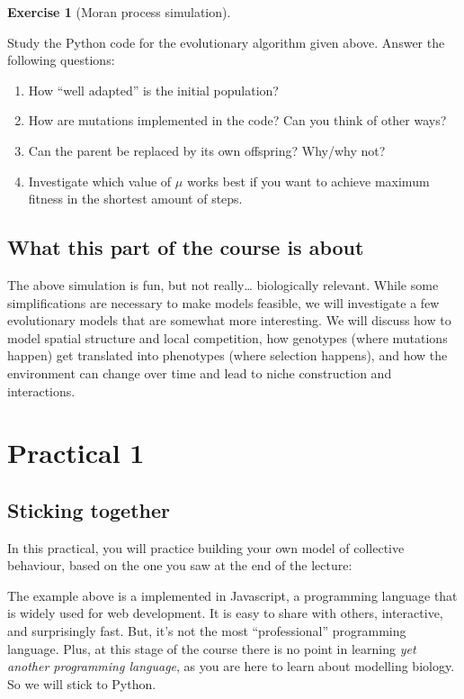 \documentclass[
  letterpaper,
  DIV=11,
  numbers=noendperiod]{scrreprt}
\providecommand{\tightlist}{%
  \setlength{\itemsep}{0pt}\setlength{\parskip}{0pt}}\usepackage{longtable,booktabs,array}
\theoremstyle{definition}
\newtheorem{exercise}{Exercise}[chapter]
\theoremstyle{remark}
\begin{document}
\begin{exercise}[Moran process
simulation]\protect\hypertarget{exr-moran}{}\label{exr-moran}

Study the Python code for the evolutionary algorithm given above. Answer
the following questions:

\begin{enumerate}
\def\labelenumi{\alph{enumi}.}
\tightlist
\item
  How ``well adapted'' is the initial population?
\item
  How are mutations implemented in the code? Can you think of other
  ways?
\item
  Can the parent be replaced by its own offspring? Why/why not?
\item
  Investigate which value of \(\mu\) works best if you want to achieve
  maximum fitness in the shortest amount of steps.
\end{enumerate}

\end{exercise}

\section{What this part of the course is
about}\label{what-this-part-of-the-course-is-about}

The above simulation is fun, but not really\ldots{} biologically
relevant. While some simplifications are necessary to make models
feasible, we will investigate a few evolutionary models that are
somewhat more interesting. We will discuss how to model spatial
structure and local competition, how genotypes (where mutations happen)
get translated into phenotypes (where selection happens), and how the
environment can change over time and lead to niche construction and
interactions.

\chapter{Practical 1}\label{practical-1-3}

\section{Sticking together}\label{sticking-together}

In this practical, you will practice building your own model of
collective behaviour, based on the one you saw at the end of the
lecture:

The example above is a implemented in Javascript, a programming language
that is widely used for web development. It is easy to share with
others, interactive, and surprisingly fast. But, it's not the most
``professional'' programming language. Plus, at this stage of the course
there is no point in learning \emph{yet another programming language},
as you are here to learn about modelling biology. So we will stick to
Python.
\end{document}
